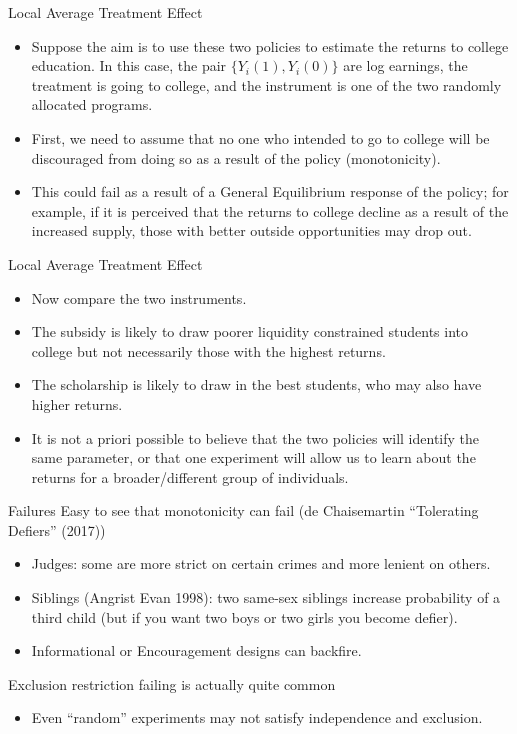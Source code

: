 \documentclass[xcolor=pdftex,dvipsnames,table,mathserif,aspectratio=169]{beamer}
\begin{document}
\begin{frame}{Local Average Treatment Effect}
\begin{itemize}
\item Suppose the aim is to use these two policies to estimate the returns to college education. In this case, the pair $\{Y_i(1), Y_i(0)\}$ are log earnings, the treatment is going to college, and the instrument is one of the two randomly allocated programs.
\item First, we need to assume that no one who intended to go to college will be discouraged from doing so as a result of the policy (monotonicity).
\item This could fail as a result of a General Equilibrium response of the policy; for example, if it is perceived that the returns to college decline as a result of the increased supply, those with better outside opportunities may drop out.
\end{itemize}
\end{frame}


\begin{frame}{Local Average Treatment Effect}
\begin{itemize}
\item Now compare the two instruments.
\item The subsidy is likely to draw poorer liquidity constrained students into college but not necessarily those with the highest returns.
\item The scholarship is likely to draw in the best students, who may also have higher returns.
\item It is not a priori possible to believe that the two policies will identify the same parameter, or that one experiment will allow us to learn about the returns for a broader/different group of individuals.
\end{itemize}
\end{frame}

\begin{frame}{Failures}
Easy to see that \alert{monotonicity can fail}  (de Chaisemartin ``Tolerating Defiers'' (2017))
\begin{itemize}
\item Judges: some are more strict on certain crimes and more lenient on others.
\item Siblings (Angrist Evan 1998): two same-sex siblings increase probability of a third child (but if you want two boys or two girls you become \alert{defier}).
\item Informational or Encouragement designs can backfire.
\end{itemize}
\alert{Exclusion restriction failing} is actually quite common
\begin{itemize}
\item Even ``random'' experiments may not satisfy independence and exclusion.
\end{itemize}
 
\end{frame}
\end{document}
